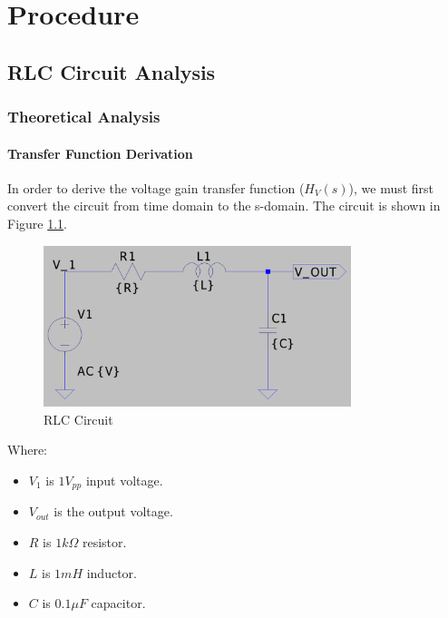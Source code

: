 \chapter{Procedure}

\section{RLC Circuit Analysis}

\subsection{Theoretical Analysis}

\subsubsection{Transfer Function Derivation}
In order to derive the voltage gain transfer function ($H_{V}(s)$), we must first convert the circuit from time domain to the s-domain. The circuit is shown in Figure \ref{fig:rlc_circuit}.

\begin{figure}[h]
    \centering
    \includegraphics[width=0.8\textwidth]{assets/rlc-circ.png}
    \caption{RLC Circuit}
    \label{fig:rlc_circuit}
\end{figure}

\noindent Where:
\begin{itemize}
    \item $V_{1}$ is $1 V_{pp}$ input voltage.
    \item $V_{out}$ is the output voltage.
    \item $R$ is $1k\Omega$ resistor.
    \item $L$ is $1mH$ inductor.
    \item $C$ is $0.1\mu F$ capacitor.
\end{itemize}

\newpage
\thispagestyle{plain}

